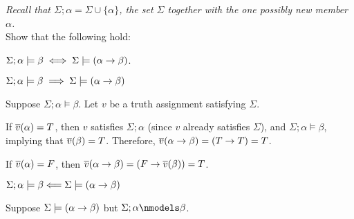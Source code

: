 
\begin{problem}
  \emph{Recall that $\Sigma ; \alpha = \Sigma \cup \{ \alpha \}$,
  the set $\Sigma$ together with the one possibly new member $\alpha$.}
  \\
  Show that the following hold:
  \begin{enumalph}
    \item $\Sigma ; \alpha \models \beta \;\Longleftrightarrow\; \Sigma \models (\alpha \rightarrow \beta)$.
    \begin{Answer}
      \begin{enumroman}
        \item $\Sigma ; \alpha \models \beta \implies \Sigma \models (\alpha \rightarrow \beta)$
        
          \step
          Suppose $\Sigma ; \alpha \models \beta$.
          Let $v$ be a truth assignment satisfying $\Sigma$.

          \step
          If $\overline{v}(\alpha) = T$, then $v$ satisfies $\Sigma ; \alpha$
          (since $v$ already satisfies $\Sigma$), and $\Sigma ; \alpha \models \beta$,
          implying that $\overline{v}(\beta) = T$.
          Therefore, $\overline{v}(\alpha \rightarrow \beta) = (T \rightarrow T) = T$.

          \step
          If $\overline{v}(\alpha) = F$, then $\overline{v}(\alpha \rightarrow \beta) = (F \rightarrow \overline{v}(\beta)) = T$.

        \step
        \item $\Sigma ; \alpha \models \beta \Longleftarrow \Sigma \models (\alpha \rightarrow \beta)$
        
          \step
          Suppose $\Sigma \models (\alpha \rightarrow \beta)$ but $\Sigma ; \alpha \nmodels \beta$.


\end{enumroman}
\end{Answer}
\end{enumalph}
\end{problem}
